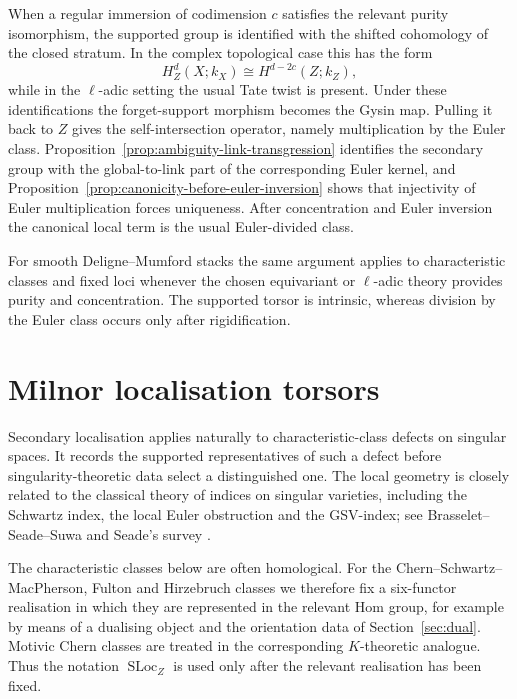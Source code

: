 \documentclass[10pt,a4paper,dvipsnames,x11names]{amsart}
\newcommand{\SLoc}{\operatorname{SLoc}}
\numberwithin{equation}{section}
\theoremstyle{plain}
\theoremstyle{definition}
\theoremstyle{remark}
\begin{document}
When a regular immersion of codimension $c$ satisfies the relevant purity isomorphism, the supported group is identified with the shifted cohomology of the closed stratum. In the complex topological case this has the form
\[
H_Z^d(X;k_X)\cong H^{d-2c}(Z;k_Z),
\]
while in the $\ell$-adic setting the usual Tate twist is present. Under these identifications the forget-support morphism becomes the Gysin map.  Pulling it back to $Z$ gives the self-intersection operator, namely multiplication by the Euler class.  Proposition~\ref{prop:ambiguity-link-transgression} identifies the secondary group with the global-to-link part of the corresponding Euler kernel, and Proposition~\ref{prop:canonicity-before-euler-inversion} shows that injectivity of Euler multiplication forces uniqueness.  After concentration and Euler inversion the canonical local term is the usual Euler-divided class.

For smooth Deligne--Mumford stacks the same argument applies to characteristic classes and fixed loci whenever the chosen equivariant or $\ell$-adic theory provides purity and concentration. The supported torsor is intrinsic, whereas division by the Euler class occurs only after rigidification.

\section{Milnor localisation torsors}\label{sec:milnor-localization-torsors}

Secondary localisation applies naturally to characteristic-class defects on singular spaces.  It records the supported representatives of such a defect before singularity-theoretic data select a distinguished one.  The local geometry is closely related to the classical theory of indices on singular varieties, including the Schwartz index, the local Euler obstruction and the GSV-index; see Brasselet--Seade--Suwa and Seade's survey \cite{BrasseletSeadeSuwaVectorFields,BrasseletSeadeSuwaOneForms,SeadeOverview}.

The characteristic classes below are often homological.  For the Chern--Schwartz--MacPherson, Fulton and Hirzebruch classes we therefore fix a six-functor realisation in which they are represented in the relevant Hom group, for example by means of a dualising object and the orientation data of Section~\ref{sec:dual}.  Motivic Chern classes are treated in the corresponding $K$-theoretic analogue.  Thus the notation $\SLoc_Z$ is used only after the relevant realisation has been fixed.
\end{document}
